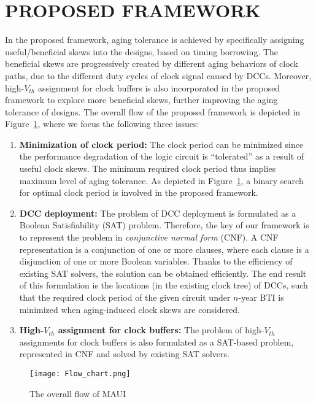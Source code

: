 \section{PROPOSED FRAMEWORK}
\label{sec:framework}
In the proposed framework, aging tolerance is achieved by specifically assigning useful/beneficial skews into the designs, based on timing borrowing. The beneficial skews are progressively created by different aging behaviors of clock paths, due to the different duty cycles of clock signal caused by DCCs. Moreover, high-$V_{th}$ assignment for clock buffers is also incorporated in the proposed framework to explore more beneficial skews, further improving the aging tolerance of designs.
The overall flow of the proposed framework is depicted in Figure~\ref{fig:flow}, where we focus the following three issues:
\begin{enumerate}[leftmargin=*]
	\item \textbf{Minimization of clock period:} The clock period can be minimized since the performance degradation of the logic circuit is \enquote{tolerated} as a result of useful clock skews. The minimum required clock period thus implies maximum level of aging tolerance. As depicted in Figure~\ref{fig:flow}, a binary search for optimal clock period is involved in the proposed framework.
	\item \textbf{DCC deployment:} The problem of  DCC deployment is formulated as a Boolean Satisfiability (SAT) problem. Therefore, the key of our framework is to represent the problem in \textit{conjunctive normal form} (CNF). A CNF representation is a conjunction of one or more clauses, where each clause is a disjunction of one or more Boolean variables. Thanks to the efficiency of existing SAT solvers, the solution can be obtained efficiently. The end result of this formulation is the locations (in the existing clock tree) of DCCs, such that the required clock period of the given circuit under $n$-year BTI is minimized when aging-induced clock skews are considered. 
	\item \textbf{High-$V_{th}$ assignment for clock buffers:} The problem of high-$V_{th}$ assignments for clock buffers is also formulated as a SAT-based problem, represented in CNF and solved by existing SAT solvers.
\end{enumerate}

\begin{figure}
	\texttt{[image: Flow\_chart.png]} %
	\caption{The overall flow of MAUI}
	\label{fig:flow}
\end{figure}
 

